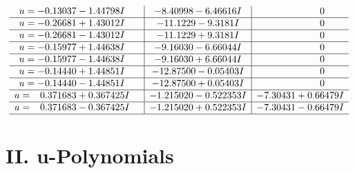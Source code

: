 \documentclass[1p]{elsarticle_modified}
\theoremstyle{definition}
\begin{document}
$$\begin{array}{c|c|c}
\begin{aligned}
u &= -0.13037 - 1.44798 I\end{aligned}
 & -8.40998 - 6.46616 I & \phantom{-0.000000 } 0 \\ \hline\begin{aligned}
u &= -0.26681 + 1.43012 I\end{aligned}
 & -11.1229 - 9.3181 I & \phantom{-0.000000 } 0 \\ \hline\begin{aligned}
u &= -0.26681 - 1.43012 I\end{aligned}
 & -11.1229 + 9.3181 I & \phantom{-0.000000 } 0 \\ \hline\begin{aligned}
u &= -0.15977 + 1.44638 I\end{aligned}
 & -9.16030 - 6.66044 I & \phantom{-0.000000 } 0 \\ \hline\begin{aligned}
u &= -0.15977 - 1.44638 I\end{aligned}
 & -9.16030 + 6.66044 I & \phantom{-0.000000 } 0 \\ \hline\begin{aligned}
u &= -0.14440 + 1.44851 I\end{aligned}
 & -12.87500 - 0.05403 I & \phantom{-0.000000 } 0 \\ \hline\begin{aligned}
u &= -0.14440 - 1.44851 I\end{aligned}
 & -12.87500 + 0.05403 I & \phantom{-0.000000 } 0 \\ \hline\begin{aligned}
u &= \phantom{-}0.371683 + 0.367425 I\end{aligned}
 & -1.215020 - 0.522353 I & -7.30431 + 0.66479 I \\ \hline\begin{aligned}
u &= \phantom{-}0.371683 - 0.367425 I\end{aligned}
 & -1.215020 + 0.522353 I & -7.30431 - 0.66479 I\\
 \hline 
 \end{array}$$\newpage
\newpage\renewcommand{\arraystretch}{1}
\centering \section*{ II. u-Polynomials}
\end{document}
